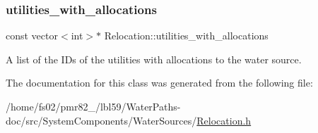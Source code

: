\subsubsection{\texorpdfstring{utilities\+\_\+with\+\_\+allocations}{utilities\_with\_allocations}}
{\footnotesize\ttfamily const vector$<$int$>$$\ast$ Relocation\+::utilities\+\_\+with\+\_\+allocations}



A list of the I\+Ds of the utilities with allocations to the water source. 



The documentation for this class was generated from the following file\+:\begin{DoxyCompactItemize}
\item 
/home/fs02/pmr82\+\_/lbl59/\+Water\+Paths-\/doc/src/\+System\+Components/\+Water\+Sources/\mbox{\hyperlink{Relocation_8h}{Relocation.\+h}}\end{DoxyCompactItemize}
